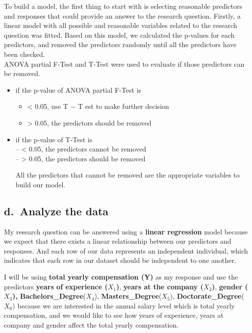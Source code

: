 \documentclass[
]{article}
\providecommand{\tightlist}{%
  \setlength{\itemsep}{0pt}\setlength{\parskip}{0pt}}
\begin{document}
\hfill\break
To build a model, the first thing to start with is selecting reasonable
predictors and responses that could provide an answer to the research
question. Firstly, a linear model with all possible and reasonable
variables related to the research question was fitted. Based on this
model, we calculated the p-values for each predictors, and removed the
predictors randomly until all the predictors have been checked.\\
ANOVA partial F-Test and T-Test were used to evaluate if those
predictors can be removed.

\begin{itemize}
\item
  if the p-value of ANOVA partial F-Test is\\

  \begin{itemize}
  \tightlist
  \item
    \textless{} 0.05, use T − T est to make further decision\\
  \item
    \textgreater{} 0.05, the predictors should be removed
  \end{itemize}
\item
  if the p-value of T-Test is\\
  -- \textless{} 0.05, the predictors cannot be removed\\
  -- \textgreater{} 0.05, the predictors should be removed

  All the predictors that cannot be removed are the appropriate
  variables to build our model.
\end{itemize}

\hypertarget{d.-analyze-the-data}{%
\subsection{d.~Analyze the data}\label{d.-analyze-the-data}}

My research question can be answered using a \textbf{linear regression}
model because we expect that there exists a linear relationship between
our predictors and responses. And each row of our data represents an
independent individual, which indicates that each row in our dataset
should be independent to one another.

I will be using \textbf{total yearly compensation (Y)} as my response
and use the predictors \textbf{years of experience (}\(X_1\)\textbf{)},
\textbf{years at the company (}\(X_2\)\textbf{)}, \textbf{gender
(}\(X_3\)\textbf{),} \textbf{Bachelors\_Degree}(\(X_4\)),
\textbf{Masters\_Degree}(\(X_5\)), \textbf{Doctorate\_Degree}(\(X_6\))
because we are interested in the annual salary level which is total
yearly compensation, and we would like to see how years of experience,
years at company and gender affect the total yearly compensation.
\end{document}
